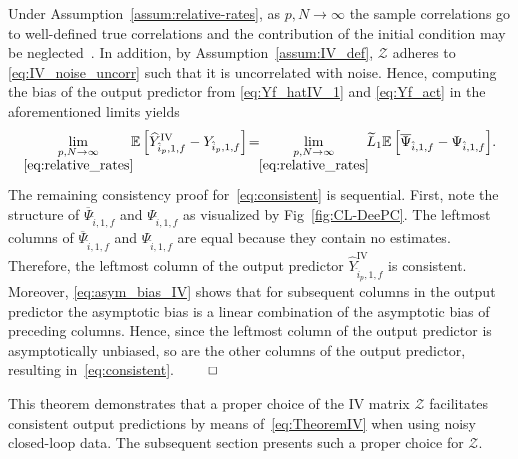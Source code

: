 Under Assumption~\ref{assum:relative-rates}, as $p,N\rightarrow\infty$ the sample correlations go to well-defined true correlations and the contribution of the initial condition may be neglected~\citep{Bauer2002,Chiuso2006}. In addition, by Assumption~\ref{assum:IV_def}, $\mathcal{Z}$ adheres to \eqref{eq:IV_noise_uncorr} such that it is uncorrelated with noise. Hence, computing the bias of the output predictor from \eqref{eq:Yf_hatIV_1} and \eqref{eq:Yf_act} in the aforementioned limits yields
\begin{align}\label{eq:asym_bias_IV}
    \lim_{\underset{\eqref{eq:relative_rates}}{p,N\rightarrow\infty}}\!\!\mathbb{E}\left[\widehat{Y}_{\hat{i}_p,1,f}^\mathrm{IV}-Y_{\hat{i}_p,1,f}\right]\!=\!\!\lim_{\underset{\eqref{eq:relative_rates}}{p,N\rightarrow\infty}}\!\!\widetilde{L}_1\mathbb{E}\left[\overline{\Psi}_{\hat{i},1,f}-\Psi_{\hat{i},1,f}\right]\!.
\end{align}
The remaining consistency proof for~\eqref{eq:consistent} is sequential. First, note the structure of $\overline{\Psi}_{\hat{i},1,f}$ and $\Psi_{\hat{i},1,f}$ as visualized by Fig~\ref{fig:CL-DeePC}. The leftmost columns of $\overline{\Psi}_{\hat{i},1,f}$ and $\Psi_{\hat{i},1,f}$ are equal because they contain no estimates. Therefore, the leftmost column of the output predictor $\widehat{Y}_{\hat{i}_p,1,f}^\mathrm{IV}$ is consistent. Moreover, \eqref{eq:asym_bias_IV} shows that for subsequent columns in the output predictor the asymptotic bias is a linear combination of the asymptotic bias of preceding columns. %
Hence, since the leftmost column of the output predictor is asymptotically unbiased, so are the other columns of the output predictor, resulting in~\eqref{eq:consistent}. $\hfill\qed$

This theorem demonstrates that a proper choice of the \acs{IV} matrix $\mathcal{Z}$ facilitates consistent output predictions by means of~\eqref{eq:TheoremIV} when using noisy closed-loop data. The subsequent section presents such a proper choice for $\mathcal{Z}$.


